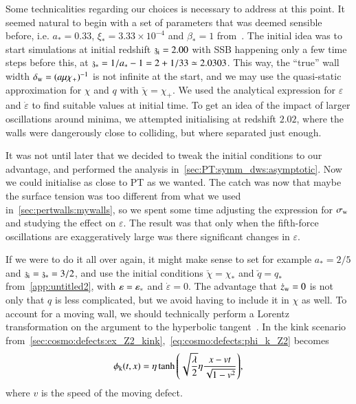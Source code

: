 


Some technicalities regarding our choices is necessary to address at this point. 
It seemed natural to begin with a set of parameters that was deemed sensible before, i.e. $a_\ast = 0.33$, $\xi_\ast = 3.33\times 10^{-4}$ and $\beta_\ast = 1$ from~\citet{christiansenAsevolutionRelativisticNbody2023}. %
The initial idea was to start simulations at initial redshift $\mathfrak{z}_\mathrm{i}=2.00$ with SSB happening only a few time steps before this, at $\mathfrak{z}_\ast = 1/a_\ast - 1 = 2 + 1/33 \simeq 2.0303$. This way, the ``true'' wall width $\delta_\mathrm{w} = (a\mu\chi_+)^{-1}$ is not infinite at the start, and we may use the quasi-static approximation for $\chi$ and $q$ with $\breve{\chi}= \chi_+$. We used the analytical expression for $\varepsilon$ and $\dot{\varepsilon}$ to find suitable values at initial time. To get an idea of the impact of larger oscillations around minima, we attempted initialising at redshift $2.02$, where the walls were dangerously close to colliding, but where separated just enough. 



It was not until later that we decided to tweak the initial conditions to our advantage, and performed the analysis in~\cref{sec:PT:symm_dws:asymptotic}. Now we could initialise as close to PT as we wanted. The catch was now that maybe the surface tension was too different from what we used in~\cref{sec:pertwalls:mywalls}, so we spent some time adjusting the expression for $\sigma_\mathrm{w}$ and studying the effect on $\varepsilon$. The result was that only when the fifth-force oscillations are exaggeratively large was there significant changes in $\varepsilon$. 


If we were to do it all over again, it might make sense to set %
for example 
$a_\ast = 2/5$ and $\mathfrak{z}_\mathrm{i}=\mathfrak{z}_\ast = 3/2$, %
and use the initial conditions $\breve{\chi}=\chi_\ast$ and $\breve{q}=q_\ast$ from~\cref{app:untitled2}, with $\varepsilon=\varepsilon_\ast$ and $\dot{\varepsilon}=0$. %
The advantage that $\dot{z}_\mathrm{w}=0$ is not only that $q$ is less complicated, but we avoid having to include it in $\chi$ as well. To account for a moving wall, we should technically perform a Lorentz transformation on the argument to the hyperbolic tangent~\citep{vachaspatiKinksDomainWalls2006,blanco-pilladoDynamicsDomainWall2023}. In the kink scenario from~\cref{sec:cosmo:defects:ex_Z2_kink},~\cref{eq:cosmo:defects:phi_k_Z2} becomes~\citep{vachaspatiKinksDomainWalls2006}
\begin{equation}
    \phi_\mathrm{k}(t, x ) = \eta \tanh{{\left( \sqrt{\frac{\lambda}{2}}\eta  \frac{x - vt}{\sqrt{1-v^2}}  \right)}},
\end{equation}
where $v$ is the speed of the moving defect.

